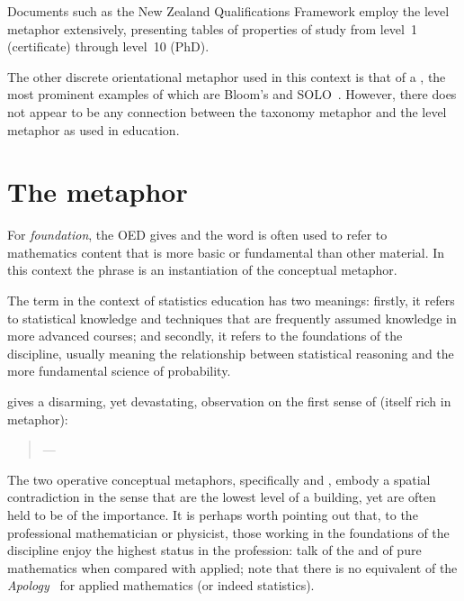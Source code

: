 \noindent
Documents such as the New Zealand Qualifications Framework employ the
level metaphor extensively, presenting tables of properties of study
from level~1 (certificate) through level~10 (PhD).

The other discrete orientational metaphor used in this context is that
of a , the most prominent examples of which are
Bloom's \parencite{anderson2001} and SOLO~\parencite{biggs1982}.
However, there does not appear to be any connection between the
taxonomy metaphor and the level metaphor as used in education.

\section{The  metaphor}

For \emph{foundation}, the OED gives  and the word is
often used to refer to mathematics content that is more basic or
fundamental than other material.  In this context the phrase is an
instantiation of the  conceptual
metaphor.

The term  in the context of statistics education
has two meanings: firstly, it refers to statistical knowledge and
techniques that are frequently assumed knowledge in more advanced
courses; and secondly, it refers to the foundations of the discipline,
usually meaning the relationship between statistical reasoning and the
more fundamental science of probability.

 gives a disarming, yet devastating, observation on
the first sense of  (itself rich in metaphor):

\begin{singlespace}
\begin{quote}
  ---
\end{quote}
\end{singlespace}

\noindent
The two operative conceptual metaphors, specifically  and , embody a spatial
contradiction in the sense that  are the lowest
level of a building, yet are often held to be of the
 importance.  It is perhaps worth pointing out that,
to the professional mathematician or physicist, those working in the
foundations of the discipline enjoy the highest status in the
profession: \cite[pages 469--571]{mcculloch2013} talk of the
 and  of pure mathematics
when compared with applied; note that there is no equivalent of the
\emph{Apology}~\parencite{hardy1940} for applied mathematics (or
indeed statistics).

